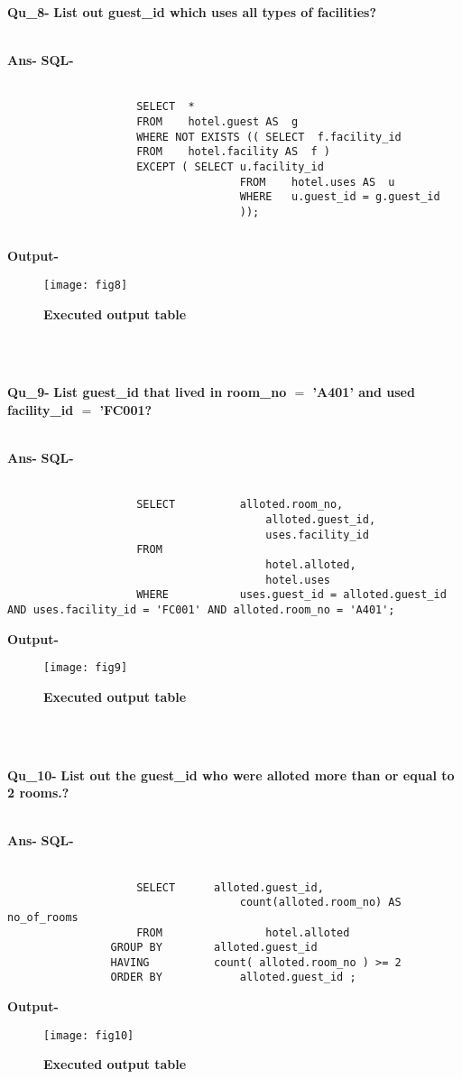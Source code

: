 \documentclass[a4,12pt]{report}
\begin{document}
\textbf{Qu\_8-}  \textbf{List out guest\_id which uses all types of facilities?} \\\

\textbf{Ans-}		\textbf{SQL-} \\\
\begin{lstlisting}
					SELECT  *
					FROM	hotel.guest AS  g
					WHERE NOT EXISTS (( SELECT	f.facility_id 
					FROM	hotel.facility AS  f )
					EXCEPT ( SELECT	u.facility_id
									FROM	hotel.uses AS  u
									WHERE	u.guest_id = g.guest_id
									));
					
\end{lstlisting}
\textbf{Output-} \\			   
\begin{figure}[hbtp]
\centering
\texttt{[image: fig8]}
\caption{\textbf{{\color{red}Executed output table}}}
\end{figure}
\\\

\textbf{Qu\_9-}  \textbf{List guest\_id that lived in room\_no $=$ 'A401' and used facility\_id $=$ 'FC001?} \\\

\textbf{Ans-}		\textbf{SQL-} \\\
\begin{lstlisting}
					SELECT			alloted.room_no, 
										alloted.guest_id,  
										uses.facility_id
					FROM 
										hotel.alloted,
										hotel.uses
					WHERE 			uses.guest_id = alloted.guest_id   AND uses.facility_id = 'FC001' AND alloted.room_no = 'A401';
\end{lstlisting}
\textbf{Output-} \\			   
\begin{figure}[hbtp]
\centering
\texttt{[image: fig9]}
\caption{\textbf{{\color{red}Executed output table}}}
\end{figure}
\\\

\textbf{Qu\_10-}  \textbf{List out the guest\_id who were alloted more than or equal to 2 rooms.?} \\\

\textbf{Ans-}		\textbf{SQL-} \\\
\begin{lstlisting}
					SELECT		alloted.guest_id, 
									count(alloted.room_no) AS no_of_rooms
					FROM				hotel.alloted
            	GROUP BY 		alloted.guest_id
            	HAVING			count( alloted.room_no ) >= 2
            	ORDER BY			alloted.guest_id ;
\end{lstlisting}
\textbf{Output-} \\			   
\begin{figure}[hbtp]
\centering
\texttt{[image: fig10]}
\caption{\textbf{{\color{red}Executed output table}}}
\end{figure}
\\\
\end{document}
